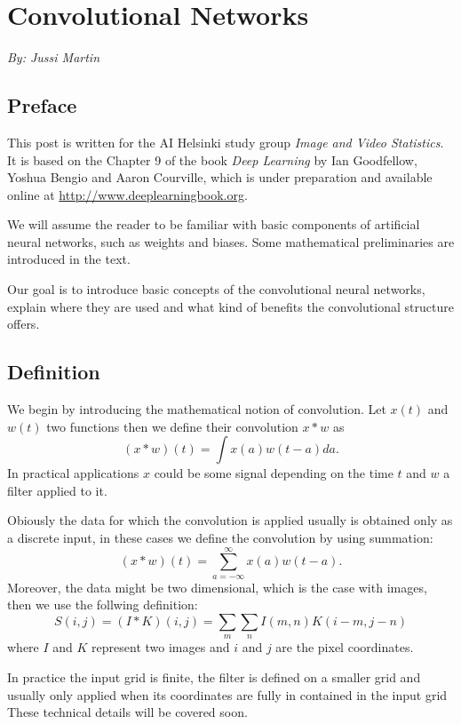 \documentclass[]{article}
\begin{document}
\section{Convolutional Networks}
\begin{center}
  \emph{By: Jussi Martin}
\end{center}
\subsection{Preface}
This post is written for the AI Helsinki study group \emph{Image and Video Statistics}.
It is based on the Chapter 9 of the book \emph{Deep Learning} by Ian Goodfellow,
Yoshua Bengio and Aaron Courville, which is under preparation and available
online at \url{http://www.deeplearningbook.org}.

We will assume the reader to be familiar with basic components of artificial
neural networks, such as weights and biases. Some mathematical preliminaries are
introduced in the text.

Our goal is to introduce basic concepts of the convolutional neural networks,
explain where they are used and what kind of benefits the convolutional
structure offers.


\subsection{Definition}
We begin by introducing the mathematical notion of convolution. Let $x(t)$ and $w(t)$
two functions then we define their convolution $x * w$ as
\[
(x * w)(t) = \int x(a)w(t - a)da.
\]
In practical applications $x$ could be some signal depending on the time $t$ and
$w$ a filter applied to it.

Obiously the data for which the convolution is applied usually is obtained only
as a discrete input, in these cases we define the convolution by using
summation:
\[
(x * w)(t) = \sum_{a = -\infty}^{\infty} x(a)w(t - a).
\]
Moreover, the data might be two dimensional, which is the case with images, then
we use the follwing definition:
\[
S(i, j) = (I * K)(i, j) = \sum_m \sum_n I(m , n) K(i - m, j - n)
\]
where $I$ and $K$ represent two images and $i$ and $j$ are the pixel coordinates.

In practice the input grid is finite, the filter is defined on a smaller grid and
usually only applied when its coordinates are fully in contained in the input grid
These technical details will be covered soon.
\end{document}
